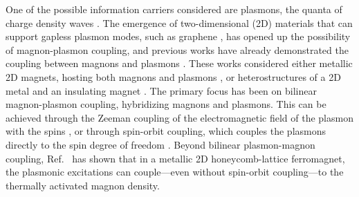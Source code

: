 \documentclass[aps,prb,reprint,twocolumns,superscriptaddress,nofootinbib]{revtex4-2}
\begin{document}
	One of the possible information carriers considered are plasmons, the quanta of charge density waves \cite{alonsocalafellQuantumComputingGraphene2019}. 
	The emergence of two-dimensional (2D) materials that can support gapless plasmon modes, such as graphene \cite{hwangDielectricFunctionScreening2007, vafekThermoplasmaPolaritonScaling2006, wangCollectiveExcitationsDirac2007, wunschDynamicalPolarizationGraphene2006,luoPlasmonsGrapheneRecent2013}, has opened up the possibility of magnon-plasmon coupling, and previous works have already demonstrated the coupling between magnons and plasmons \cite{efimkinTopologicalSpinplasmaWaves2021, dyrdalMagnonplasmonHybridizationMediated2023,costaStronglyCoupledMagnonplasmon2023, ghoshPlasmonmagnonInteractionsTwodimensional2023,yuanStrongTunableCoupling2024,yuanBreakingSurfacePlasmonExcitation2024}. These works considered either metallic 2D magnets, hosting both magnons and plasmons \cite{ghoshPlasmonmagnonInteractionsTwodimensional2023,dyrdalMagnonplasmonHybridizationMediated2023}, or heterostructures of a 2D metal and an insulating magnet \cite{efimkinTopologicalSpinplasmaWaves2021,costaStronglyCoupledMagnonplasmon2023,yuanStrongTunableCoupling2024,yuanBreakingSurfacePlasmonExcitation2024}. The primary focus has been on bilinear magnon-plasmon coupling, hybridizing magnons and plasmons. This can be achieved through the Zeeman coupling of the electromagnetic field of the plasmon with the spins \cite{costaStronglyCoupledMagnonplasmon2023,yuanStrongTunableCoupling2024,yuanBreakingSurfacePlasmonExcitation2024}, or through spin-orbit coupling, which couples the plasmons directly to the spin degree of freedom \cite{dyrdalMagnonplasmonHybridizationMediated2023,efimkinTopologicalSpinplasmaWaves2021}. Beyond bilinear plasmon-magnon coupling, Ref.~\cite{ghoshPlasmonmagnonInteractionsTwodimensional2023} has shown that in a metallic 2D honeycomb-lattice ferromagnet, the plasmonic excitations can couple---even without spin-orbit coupling---to the thermally activated magnon density. 
	
	
	
\end{document}
